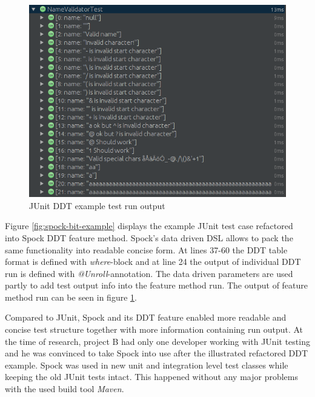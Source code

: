     \begin{figure}[H]
      \begin{center}
        \includegraphics[width=11.7cm]{images/junit-validator-results.png}
        \caption{JUnit DDT example test run output}
        \label{fig:junit-bit-results}
      \end{center}
    \end{figure}

    Figure \ref{fig:spock-bit-example} displays the example JUnit test case refactored into Spock DDT feature method. Spock's
    data driven DSL allows to pack the same functionality into readable concise form.  At lines 37-60 the DDT table format
    is defined with \textit{where}-block and at line 24 the output of individual DDT run is defined with \textit{@Unroll}-annotation.
    The data driven parameters are used partly
    to add test output info into the feature method run. The output of feature method run can
    be seen in figure \ref{fig:junit-bit-results}.

    Compared to JUnit, Spock and its DDT feature enabled more readable and concise test structure together with more information
    containing run output. At the time of research, project B had only one developer working with JUnit testing and
    he was convinced to take Spock into use after the illustrated refactored DDT example. Spock was used in new unit and
    integration level test classes while keeping the old JUnit tests intact. This happened without any major
    problems with the used build tool \textit{Maven}.

